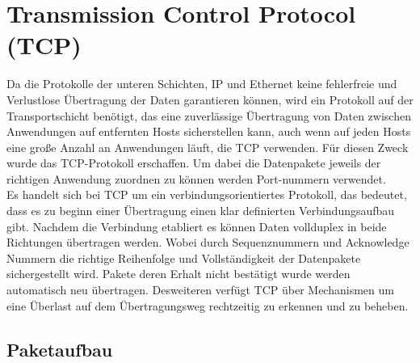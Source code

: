 \section{Transmission Control Protocol (TCP)}
Da die Protokolle der unteren Schichten, IP und Ethernet keine fehlerfreie und Verlustlose Übertragung der Daten garantieren können, wird ein Protokoll auf der Transportschicht benötigt, das eine zuverlässige Übertragung von Daten zwischen Anwendungen auf entfernten Hosts sicherstellen kann, auch wenn auf jeden Hosts eine große Anzahl an Anwendungen läuft, die TCP verwenden. Für diesen Zweck wurde das TCP-Protokoll erschaffen. Um dabei die Datenpakete jeweils der richtigen Anwendung zuordnen zu können werden Port-nummern verwendet. \\
Es handelt sich bei TCP um ein verbindungsorientiertes Protokoll, das bedeutet, dass es zu beginn einer Übertragung einen klar definierten Verbindungsaufbau gibt. Nachdem die Verbindung etabliert es können Daten vollduplex in beide Richtungen übertragen werden. Wobei durch Sequenznummern und Acknowledge Nummern die richtige Reihenfolge und Vollständigkeit der Datenpakete sichergestellt wird. Pakete deren Erhalt nicht bestätigt wurde werden automatisch neu übertragen. Desweiteren verfügt TCP über Mechanismen um eine Überlast auf dem Übertragungsweg rechtzeitig zu erkennen und zu beheben.  

\subsection{Paketaufbau}


